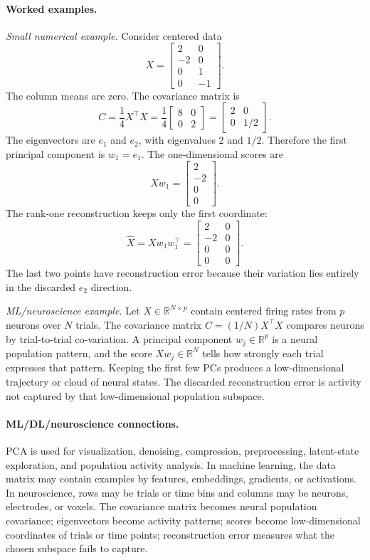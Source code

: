 \paragraph{Worked examples.}
\emph{Small numerical example.} Consider centered data
\[
X=
\begin{bmatrix}
2&0\\
-2&0\\
0&1\\
0&-1
\end{bmatrix}.
\]
The column means are zero. The covariance matrix is
\[
C=\frac{1}{4}X^\top X
=
\frac{1}{4}
\begin{bmatrix}
8&0\\
0&2
\end{bmatrix}
=
\begin{bmatrix}
2&0\\
0&1/2
\end{bmatrix}.
\]
The eigenvectors are \(e_1\) and \(e_2\), with eigenvalues \(2\) and \(1/2\). Therefore the first principal component is \(w_1=e_1\). The one-dimensional scores are
\[
Xw_1=
\begin{bmatrix}
2\\
-2\\
0\\
0
\end{bmatrix}.
\]
The rank-one reconstruction keeps only the first coordinate:
\[
\widehat X=Xw_1w_1^\top=
\begin{bmatrix}
2&0\\
-2&0\\
0&0\\
0&0
\end{bmatrix}.
\]
The last two points have reconstruction error because their variation lies entirely in the discarded \(e_2\) direction.

\emph{ML/neuroscience example.} Let \(X\in\mathbb{R}^{N\times p}\) contain centered firing rates from \(p\) neurons over \(N\) trials. The covariance matrix \(C=(1/N)X^\top X\) compares neurons by trial-to-trial co-variation. A principal component \(w_j\in\mathbb{R}^p\) is a neural population pattern, and the score \(Xw_j\in\mathbb{R}^N\) tells how strongly each trial expresses that pattern. Keeping the first few PCs produces a low-dimensional trajectory or cloud of neural states. The discarded reconstruction error is activity not captured by that low-dimensional population subspace.

\paragraph{ML/DL/neuroscience connections.}
PCA is used for visualization, denoising, compression, preprocessing, latent-state exploration, and population activity analysis. In machine learning, the data matrix may contain examples by features, embeddings, gradients, or activations. In neuroscience, rows may be trials or time bins and columns may be neurons, electrodes, or voxels. The covariance matrix becomes neural population covariance; eigenvectors become activity patterns; scores become low-dimensional coordinates of trials or time points; reconstruction error measures what the chosen subspace fails to capture.


